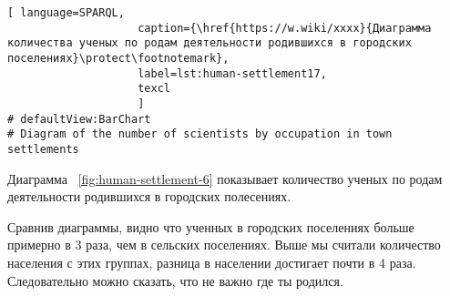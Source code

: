 \begin{lstlisting}[ language=SPARQL, 
                    caption={\href{https://w.wiki/xxxx}{Диаграмма количества ученых по родам деятельности родившихся в городских поселениях}\protect\footnotemark},
                    label=lst:human-settlement17,
                    texcl 
                    ]
# defaultView:BarChart
# Diagram of the number of scientists by occupation in town settlements

\end{lstlisting}%

Диаграмма ~\ref{fig:human-settlement-6} показывает количество ученых по родам деятельности родившихся в городских полесениях.

\begin{figure*}
    \setlength{\fboxsep}{0pt}%
    \setlength{\fboxrule}{1pt}%
	\label{fig:human-settlement-6}
	\caption[Диаграмма количества ученых по родам деятельности родившихся в городских поселениях.]{Диаграмма количества ученых по родам деятельности родившихся в городских поселениях. Ссылка на SPARQL-запрос: \href{https://w.wiki/xxxx}{https://w.wiki/xxxx}}%
\end{figure*} 

Сравнив диаграммы, видно что ученных в городских поселениях больше примерно в 3 раза, чем в сельских поселениях. Выше мы считали количество населения с этих группах, разница в населении достигает почти в 4 раза. Следовательно можно сказать, что не важно где ты родился. 
